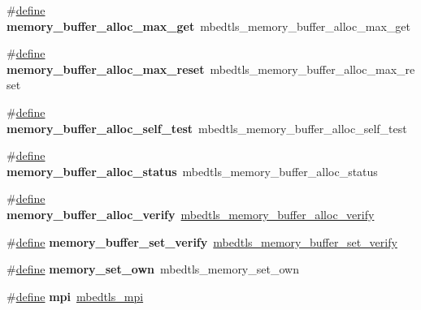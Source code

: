 \begin{DoxyCompactItemize}
\item 
\mbox{\label{compat-1_83_8h_a0b6a07fdc3d6c16403e127436959a4a4}} 
\#\hyperlink{structdefine}{define} {\bfseries memory\+\_\+buffer\+\_\+alloc\+\_\+max\+\_\+get}~mbedtls\+\_\+memory\+\_\+buffer\+\_\+alloc\+\_\+max\+\_\+get
\item 
\mbox{\label{compat-1_83_8h_a119fc4a07965fabfecadc0ae133eb6fd}} 
\#\hyperlink{structdefine}{define} {\bfseries memory\+\_\+buffer\+\_\+alloc\+\_\+max\+\_\+reset}~mbedtls\+\_\+memory\+\_\+buffer\+\_\+alloc\+\_\+max\+\_\+reset
\item 
\mbox{\label{compat-1_83_8h_a8614a103986002804a2a67b8d33f4236}} 
\#\hyperlink{structdefine}{define} {\bfseries memory\+\_\+buffer\+\_\+alloc\+\_\+self\+\_\+test}~mbedtls\+\_\+memory\+\_\+buffer\+\_\+alloc\+\_\+self\+\_\+test
\item 
\mbox{\label{compat-1_83_8h_a6eac95ba179c3d1404e38aaebf65317f}} 
\#\hyperlink{structdefine}{define} {\bfseries memory\+\_\+buffer\+\_\+alloc\+\_\+status}~mbedtls\+\_\+memory\+\_\+buffer\+\_\+alloc\+\_\+status
\item 
\mbox{\label{compat-1_83_8h_affa3c902540bce24beda3a6fb7ab770e}} 
\#\hyperlink{structdefine}{define} {\bfseries memory\+\_\+buffer\+\_\+alloc\+\_\+verify}~\hyperlink{memory__buffer__alloc_8h_a7aae8a0cd61f08dd6734ebc8a8a3ba38}{mbedtls\+\_\+memory\+\_\+buffer\+\_\+alloc\+\_\+verify}
\item 
\mbox{\label{compat-1_83_8h_a05560341919cae231f6512d8890a317c}} 
\#\hyperlink{structdefine}{define} {\bfseries memory\+\_\+buffer\+\_\+set\+\_\+verify}~\hyperlink{memory__buffer__alloc_8h_aaa50603bb2f2f1fe8d97d6953589b832}{mbedtls\+\_\+memory\+\_\+buffer\+\_\+set\+\_\+verify}
\item 
\mbox{\label{compat-1_83_8h_ac1e9c5610ef981ee0b6ec84e55fbec54}} 
\#\hyperlink{structdefine}{define} {\bfseries memory\+\_\+set\+\_\+own}~mbedtls\+\_\+memory\+\_\+set\+\_\+own
\item 
\mbox{\label{compat-1_83_8h_ab8a58149c3175c180a0b60682aa9d75b}} 
\#\hyperlink{structdefine}{define} {\bfseries mpi}~\hyperlink{structmbedtls__mpi}{mbedtls\+\_\+mpi}

\end{DoxyCompactItemize}
